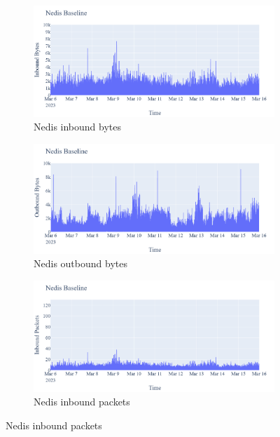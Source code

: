 \begin{figure}[H]
    \centering
    \begin{subfigure}[b]{0.4\textwidth}
        \includegraphics[width=\textwidth]{figures/Nedis_Baseline_InboundBytes.png}
        \caption{Nedis inbound bytes}
    \end{subfigure}
    \begin{subfigure}[b]{0.4\textwidth}
        \includegraphics[width=\textwidth]{figures/Nedis_Baseline_OutboundBytes.png}
        \caption{Nedis outbound bytes}
    \end{subfigure}
    \begin{subfigure}[b]{0.4\textwidth}
        \includegraphics[width=\textwidth]{figures/Nedis_Baseline_InboundPackets.png}
        \caption{Nedis inbound packets}

\end{subfigure}
\end{figure}
